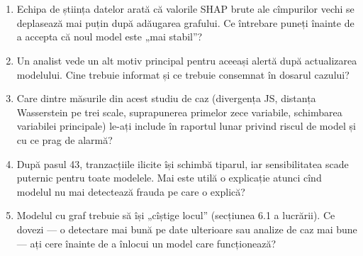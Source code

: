 \section{}
\begin{enumerate}
\item {}%
{Echipa de știința datelor arată că valorile SHAP brute ale cîmpurilor vechi se deplasează mai puțin după adăugarea grafului. Ce întrebare puneți înainte de a accepta că noul model este „mai stabil”?}
\item {}%
{Un analist vede un alt motiv principal pentru aceeași alertă după actualizarea modelului. Cine trebuie informat și ce trebuie consemnat în dosarul cazului?}
\item {}%
{Care dintre măsurile din acest studiu de caz (divergența JS, distanța Wasserstein pe trei scale, suprapunerea primelor zece variabile, schimbarea variabilei principale) le-ați include în raportul lunar privind riscul de model și cu ce prag de alarmă?}
\item {}%
{După pasul 43, tranzacțiile ilicite își schimbă tiparul, iar sensibilitatea scade puternic pentru toate modelele. Mai este utilă o explicație atunci cînd modelul nu mai detectează frauda pe care o explică?}
\item {}%
{Modelul cu graf trebuie să își „cîștige locul” (secțiunea 6.1 a lucrării). Ce dovezi --- o detectare mai bună pe date ulterioare sau analize de caz mai bune --- ați cere înainte de a înlocui un model care funcționează?}
\end{enumerate}

